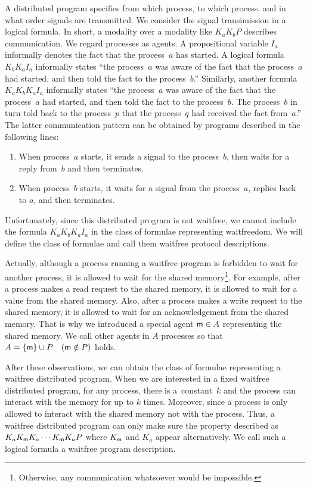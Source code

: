   A distributed program specifies
  from which process, to which process, and in what order
  signals are transmitted.
  We consider the signal transimission in a logical formula.
  In short, a modality over a modality like $K_a K_b P$ describes communication.
  We regard processes as agents.
  A propositional variable $I_a$ informally denotes the fact that the process~$a$ has
  started.
  A logical formula $K_b K_a I_a$ informally states
  ``the process~$a$ was aware of the fact that the process~$a$ had started,
  and then told the fact to the process~$b$.''
  Similarly, another formula $K_a K_b K_a I_a$ informally states
  ``the process~$a$ was aware of the fact that the process~$a$ had started,
  and then told the fact to the process~$b$. The process~$b$ in turn told back to the
  process~$p$ that the process~$q$ had received the fact from~$a$.''
  The latter communication pattern can be obtained by programs described in the following lines:
  \begin{enumerate}
   \item When process~$a$ starts, it sends a signal to the process~$b$, then waits for a
	 reply from~$b$ and then terminates.
   \item When process~$b$ starts, it waits for a signal from the process~$a$,
	 replies back to $a$, and then terminates.
  \end{enumerate}
  Unfortunately,
  since this distributed program is not waitfree,
  we cannot include the formula
  $K_a K_b K_a I_a$
  in the class of formulae representing waitfreedom.
  We will define the class of formulae and call them waitfree protocol descriptions.

  Actually, although a process running a waitfree program is forbidden to wait for another process,
  it is allowed to wait for the shared memory\footnote{Otherwise, any communication
  whatsoever would be impossible.}.
  For example, after a process
  makes a read request to the shared memory,
  it is allowed to wait for a value from the shared memory.
  Also, after a process makes a write request to the shared memory,
  it is allowed to wait for an acknowledgement from the shared memory.
  That is why we introduced a special agent ${\sf m}\in A$ representing the shared memory.
  We call other agents in $A$ processes so that
  $A=\{{\sf m}\}\cup P\quad ({\sf m}\notin P)$ holds.

  After these observations, we can obtain the class of
  formulae representing a waitfree distributed program.
  When we are interested in a fixed waitfree distributed program,
  for any process, there is a~constant~$k$ and the process can interact with the memory for
  up to $k$ times.
  Moreover, since a process is only allowed to interact with the shared memory not with the
  process.
  Thus, a waitfree distributed program can only make sure the property described as
  $K_aK_{\sf m} K_a\cdots K_{\sf m} K_a P$ where $K_{\sf m}$ and $K_a$ appear
  alternatively.
  We call such a logical formula a waitfree program description.

